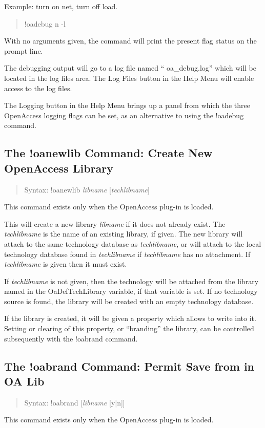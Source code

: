 Example: turn on {\vt net}, turn off {\vt load}.
\begin{quote}
\vt !oadebug n -l
\end{quote}

With no arguments given, the command will print the present flag
status on the prompt line.

The debugging output will go to a log file named ``{\vt
oa\_debug.log}'' which will be located in the log files area.  The {\cb
Log Files} button in the {\cb Help Menu} will enable access to the log
files.

The {\cb Logging} button in the {\cb Help Menu} brings up a panel from
which the three OpenAccess logging flags can be set, as an alternative
to using the {\cb !oadebug} command.


\subsection{The {\cb !oanewlib} Command: Create New OpenAccess Library}
\begin{quote}
Syntax: {\vt !oanewlib} {\it libname} [{\it techlibname\/}]
\end{quote}
This command exists only when the OpenAccess plug-in is loaded.

This will create a new library {\it libname} if it does not already
exist.  The {\it techlibname} is the name of an existing library, if
given.  The new library will attach to the same technology database as
{\it techlibname}, or will attach to the local technology database
found in {\it techlibname} if {\it techlibname} has no attachment. 
If {\it techlibname} is given then it must exist.

If {\it techlibname} is not given, then the technology will be attached
from the library named in the {\et OaDefTechLibrary} variable, if that
variable is set.  If no technology source is found, the library will
be created with an empty technology database.

If the library is created, it will be given a property which allows
{\Xic} to write into it.  Setting or clearing of this property, or
``branding'' the library, can be controlled subsequently with the {\cb
!oabrand} command.

\subsection{The {\cb !oabrand} Command: Permit Save from {\Xic} in OA Lib}
\begin{quote}
Syntax: {\vt !oabrand} [{\it libname\/} [{\vt y|n}]]
\end{quote}
This command exists only when the OpenAccess plug-in is loaded.

